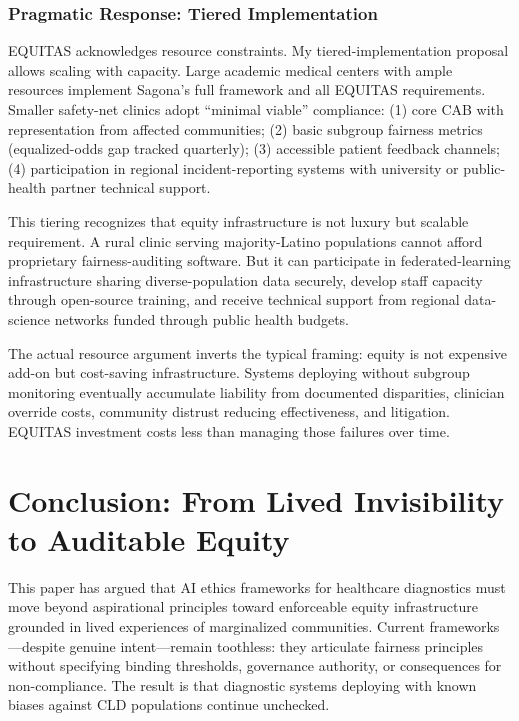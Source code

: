 \documentclass[12pt,a4paper]{article}
\begin{document}
\subsubsection{Pragmatic Response: Tiered Implementation}

EQUITAS acknowledges resource constraints. My tiered-implementation proposal allows scaling with capacity. Large academic medical centers with ample resources implement Sagona's full framework and all EQUITAS requirements. Smaller safety-net clinics adopt ``minimal viable'' compliance: (1) core CAB with representation from affected communities; (2) basic subgroup fairness metrics (equalized-odds gap tracked quarterly); (3) accessible patient feedback channels; (4) participation in regional incident-reporting systems with university or public-health partner technical support.

This tiering recognizes that equity infrastructure is not luxury but scalable requirement. A rural clinic serving majority-Latino populations cannot afford proprietary fairness-auditing software. But it can participate in federated-learning infrastructure sharing diverse-population data securely, develop staff capacity through open-source training, and receive technical support from regional data-science networks funded through public health budgets.

The actual resource argument inverts the typical framing: equity is not expensive add-on but cost-saving infrastructure. Systems deploying without subgroup monitoring eventually accumulate liability from documented disparities, clinician override costs, community distrust reducing effectiveness, and litigation. EQUITAS investment costs less than managing those failures over time.

\section{Conclusion: From Lived Invisibility to Auditable Equity}

This paper has argued that AI ethics frameworks for healthcare diagnostics must move beyond aspirational principles toward enforceable equity infrastructure grounded in lived experiences of marginalized communities. Current frameworks—despite genuine intent—remain toothless: they articulate fairness principles without specifying binding thresholds, governance authority, or consequences for non-compliance. The result is that diagnostic systems deploying with known biases against CLD populations continue unchecked.
\end{document}
